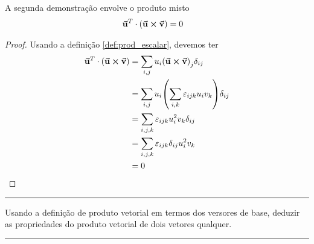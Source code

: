 \documentclass[
  a4paper,
	12pt
]{article}
\begin{document}
A segunda demonstração envolve o produto misto
\begin{align*}
	\va{u}^{T}\cdot\qty(\va{u}\cp\va{v}) &= 0
\end{align*}
\begin{proof}
	Usando a definição \ref{def:prod_escalar}, devemos ter
	\begin{align*}
		\va{u}^{T}\cdot\qty(\va{u}\cp\va{v}) &= \sum_{i,j}u_{i}\qty(\va{u}\cp\va{v})_{j} \delta_{ij}\\
																				 &= \sum_{i,j}u_{i}\qty(\sum_{i,k} \varepsilon_{ijk}u_{i}v_{k}) \delta_{ij}\\
																				 &= \sum_{i,j,k}\varepsilon_{ijk}u_{i}^{2}v_{k} \delta_{ij}\\
																				 &= \sum_{i,j,k}\varepsilon_{ijk} \delta_{ij}u_{i}^{2}v_{k}\\
																				 &= 0  
	\end{align*}

\end{proof}
\begin{center}
	\noindent\textcolor{mygray}{\rule{\textwidth}{0.5pt}}
\end{center}

\begin{problem}
	Usando a definição de produto vetorial em termos dos versores de base, deduzir as propriedades do produto vetorial de dois vetores qualquer.	
\end{problem}

\begin{center}
	\noindent\textcolor{mygray}{\rule{\textwidth}{0.5pt}}
\end{center}
\end{document}
